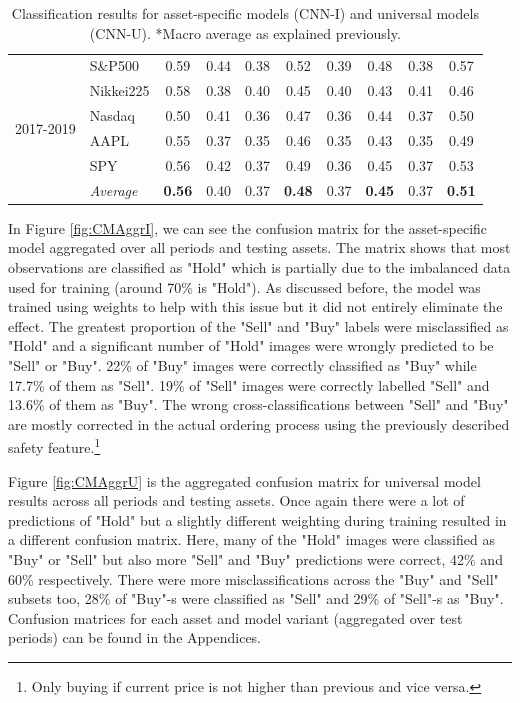 \documentclass[11pt, a4paper]{article}
\begin{document}
\begin{table}[H]
\begin{tabular}{l|l|cc|cc|cc|cc}
\multirow{6}{1cm}{2017-2019} & S\&P500          & 0.59          & 0.44 & 0.38 & 0.52          & 0.39 & 0.48          & 0.38 & 0.57          \\
& Nikkei225        & 0.58          & 0.38 & 0.40 & 0.45          & 0.40 & 0.43          & 0.41 & 0.46          \\
& Nasdaq           & 0.50          & 0.41 & 0.36 & 0.47          & 0.36 & 0.44          & 0.37 & 0.50          \\
& AAPL             & 0.55          & 0.37 & 0.35 & 0.46          & 0.35 & 0.43          & 0.35 & 0.49          \\
& SPY              & 0.56          & 0.42 & 0.37 & 0.49          & 0.36 & 0.45          & 0.37 & 0.53          \\ \cline{2-10}
& \textit{Average} & \textbf{0.56} & 0.40 & 0.37 & \textbf{0.48} & 0.37 & \textbf{0.45} & 0.37 & \textbf{0.51}
\end{tabular}
\caption{Classification results for asset-specific models (CNN-I) and universal models (CNN-U). *Macro average as explained previously.}
\label{tbl:ClassRes}
\end{table}

In Figure \ref{fig:CMAggrI}, we can see the confusion matrix for the asset-specific model aggregated over all periods and testing assets. The matrix shows that most observations are classified as "Hold" which is partially due to the imbalanced data used for training (around 70\% is "Hold"). As discussed before, the model was trained using weights to help with this issue but it did not entirely eliminate the effect. The greatest proportion of the "Sell" and "Buy" labels were misclassified as "Hold" and a significant number of "Hold" images were wrongly predicted to be "Sell" or "Buy". 22\% of "Buy" images were correctly classified as "Buy" while 17.7\% of them as "Sell". 19\% of "Sell" images were correctly labelled "Sell" and 13.6\% of them as "Buy". The wrong cross-classifications between "Sell" and "Buy" are mostly corrected in the actual ordering process using the previously described safety feature.\footnote{Only buying if current price is not higher than previous and vice versa.}

Figure \ref{fig:CMAggrU} is the aggregated confusion matrix for universal model results across all periods and testing assets. Once again there were a lot of predictions of "Hold" but a slightly different weighting during training resulted in a different confusion matrix. Here, many of the "Hold" images were classified as "Buy" or "Sell" but also more "Sell" and "Buy" predictions were correct, 42\% and 60\% respectively. There were more misclassifications across the "Buy" and "Sell" subsets too, 28\% of "Buy"-s were classified as "Sell" and 29\% of "Sell"-s as "Buy". Confusion matrices for each asset and model variant (aggregated over test periods) can be found in the Appendices.
\end{document}
